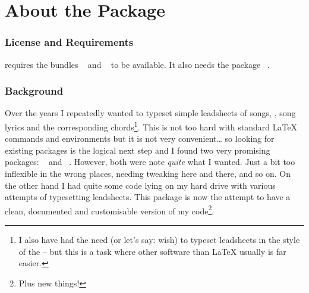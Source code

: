 \documentclass[load-preamble+]{cnltx-doc}
\begin{document}
\part{About the Package}

\section{License and Requirements}

\license

\leadsheets{} requires the bundles ~\cite{bnd:l3kernel} and
~\cite{bnd:l3packages}  to be available.  It also needs the
package ~\cite{pkg:translations}.

\section{Background}

Over the years I repeatedly wanted to typeset simple leadsheets of songs, \ie,
song lyrics and the corresponding chords\footnote{I also have had the need (or
  let's say: wish) to typeset leadsheets in the style of the
   -- but this is a task where other software than
  \LaTeX{} usually is far easier.}.  This is not too hard with standard
\LaTeX{} commands and environments but it is not very convenient\ldots{} so
looking for existing packages is the logical next step and I found two very
promising packages: ~\cite{pkg:songs} and
~\cite{pkg:songbook}.  However, both were note \emph{quite} what
I wanted.  Just a bit too inflexible in the wrong places, needing tweaking
here and there, and so on.  On the other hand I had quite some code lying on
my hard drive with various attempts of typesetting leadsheets.  This package
is now the attempt to have a clean, documented and customisable version of my
code\footnote{Plus new things!}.
\end{document}
